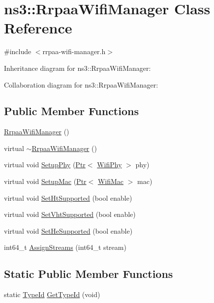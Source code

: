 \hypertarget{classns3_1_1RrpaaWifiManager}{}\section{ns3\+:\+:Rrpaa\+Wifi\+Manager Class Reference}
\label{classns3_1_1RrpaaWifiManager}


{\ttfamily \#include $<$rrpaa-\/wifi-\/manager.\+h$>$}



Inheritance diagram for ns3\+:\+:Rrpaa\+Wifi\+Manager\+:


Collaboration diagram for ns3\+:\+:Rrpaa\+Wifi\+Manager\+:
\subsection*{Public Member Functions}
\begin{DoxyCompactItemize}
\item 
\hyperlink{classns3_1_1RrpaaWifiManager_a27c80be50ff13155f630a7dd0c9b53fd}{Rrpaa\+Wifi\+Manager} ()
\item 
virtual \hyperlink{classns3_1_1RrpaaWifiManager_acc118ed0a54bae645eb2bbd269066554}{$\sim$\+Rrpaa\+Wifi\+Manager} ()
\item 
virtual void \hyperlink{classns3_1_1RrpaaWifiManager_a3694e29c2df1bc7a3e8a6702c287fff8}{Setup\+Phy} (\hyperlink{classns3_1_1Ptr}{Ptr}$<$ \hyperlink{classns3_1_1WifiPhy}{Wifi\+Phy} $>$ phy)
\item 
virtual void \hyperlink{classns3_1_1RrpaaWifiManager_aa3a17c6451d0de163bdc98497f5bf451}{Setup\+Mac} (\hyperlink{classns3_1_1Ptr}{Ptr}$<$ \hyperlink{classns3_1_1WifiMac}{Wifi\+Mac} $>$ mac)
\item 
virtual void \hyperlink{classns3_1_1RrpaaWifiManager_ae8cdfbd3a9988aacc7b592de0c67e1a6}{Set\+Ht\+Supported} (bool enable)
\item 
virtual void \hyperlink{classns3_1_1RrpaaWifiManager_a0a9e36c3747b6c43ee70edb460c8f9e4}{Set\+Vht\+Supported} (bool enable)
\item 
virtual void \hyperlink{classns3_1_1RrpaaWifiManager_aa55a0b81e013cbc84a8dc9bd55f46af1}{Set\+He\+Supported} (bool enable)
\item 
int64\+\_\+t \hyperlink{classns3_1_1RrpaaWifiManager_a83a1056519e165fead0090c7f737b9a1}{Assign\+Streams} (int64\+\_\+t stream)
\end{DoxyCompactItemize}
\subsection*{Static Public Member Functions}
\begin{DoxyCompactItemize}
\item 
static \hyperlink{classns3_1_1TypeId}{Type\+Id} \hyperlink{classns3_1_1RrpaaWifiManager_a379cb48aa45f8a841603db236f919578}{Get\+Type\+Id} (void)
\end{DoxyCompactItemize}
